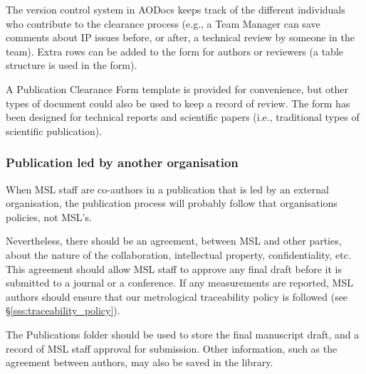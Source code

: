 The version control system in AODocs keeps track of the different individuals who contribute to the clearance process (e.g., a Team Manager can save comments about IP issues before, or after, a technical review by someone in the team). Extra rows can be added to the form for authors or reviewers (a table structure is used in the form).

A Publication Clearance Form template is provided for convenience, but other types of document could also be used to keep a record of review. The form has been designed for technical reports and scientific papers (i.e., traditional types of scientific publication).  

\subsubsection{Publication led by another organisation}

When MSL staff are co-authors in a publication that is led by an external organisation, the publication process will probably follow that organisations policies, not MSL's. 

Nevertheless, there should be an agreement, between MSL and other parties, about the nature of the collaboration, intellectual property, confidentiality, etc. This agreement should allow MSL staff to approve any final draft before it is submitted to a journal or a conference. If any measurements are reported, MSL authors should ensure that our metrological traceability policy is followed (see \S\ref{sss:traceability_policy}).

The Publications folder should be used to store the final manuscript draft, and a record of MSL staff approval for submission. Other information, such as the agreement between authors, may also be saved in the library. 

